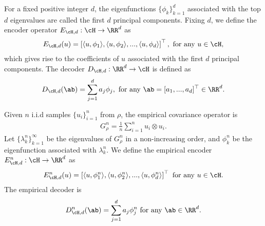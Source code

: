 \documentclass[11pt]{article} %
\begin{document}
For a fixed positive integer $d$, the eigenfunctions $\{\phi_k\}_{k=1}^d$ associated with the top $d$ eigenvalues are called the first $d$ principal components. Fixing $d$, we define the encoder operator $E_{\cH,d}:\cH\rightarrow \RR^d$ as
\begin{align}
	E_{\cH,d}(u)=\left[ \langle u,\phi_{1}\rangle, \langle u,\phi_{2}\rangle, ..., \langle u,\phi_{d}\rangle\right]^{\top}, \text{ for any  } u\in \cH,
	\label{eq.PCA.encoder}
\end{align}
which gives rise to the coefficients of $u$ associated with the first $d$ principal components.
The decoder $D_{\cH,d}: \RR^d\rightarrow \cH$ is defined as
\begin{align}
	D_{\cH,d}(\ab)=\sum_{j=1}^d a_j\phi_{j} , \text{ for any  } \ab=[a_1,...,a_d]^{\top}\in \RR^d.
	\label{eq.PCA.decoder}
\end{align}




Given $n$ i.i.d samples $\{u_i\}_{i=1}^n$ from $\rho$, the empirical covariance operator is 
\begin{align}
	G_{\rho}^n=\frac{1}{n}\sum_{i=1}^n u_i\otimes u_i.
	\label{eq.Cn}
\end{align}
Let $\{\lambda_k^n\}_{k=1}^{\infty}$ be the eigenvalues of $G^n_{\rho}$ in a non-increasing order, and $\phi^n_k$ be the eigenfunction associated with $\lambda_k^n$.
We define the empirical encoder $E_{\cH,d}^n: \cH \rightarrow \RR^d$ as 
\begin{align}
	E_{\cH,d}^n(u)=\left[ \langle u,\phi_{1}^n\rangle, \langle u,\phi_{2}^n\rangle, ..., \langle u,\phi_{d}^n\rangle\right]^{\top} \text{ for any  } u\in \cH.
	\label{eq.PCA.encoder.n}
\end{align}
The empirical decoder is
\begin{align}
	D_{\cH,d}^n(\ab)=\sum_{j=1}^d a_j{ \phi_{j}^n} \text{ for any  } \ab\in \RR^d.
	\label{eq.PCA.decoder.n}
\end{align}
\end{document}
